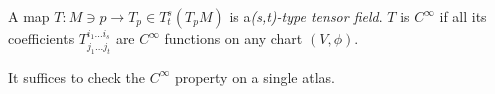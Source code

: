 \begin{definition}
A map $T: M \owns p \to T_p \in T_t^s(T_pM)$ is a\emph{(s,t)-type tensor field}. $T$ is $C^{\infty}$ if all its coefficients 
$T_{j_1 \dots j_t}^{i_1 \dots i_s}$ are $C^{\infty}$ functions on any chart $(V, \phi)$.
\end{definition}

\begin{remark}
It suffices to check the $C^{\infty}$ property on a single atlas.
\end{remark}





